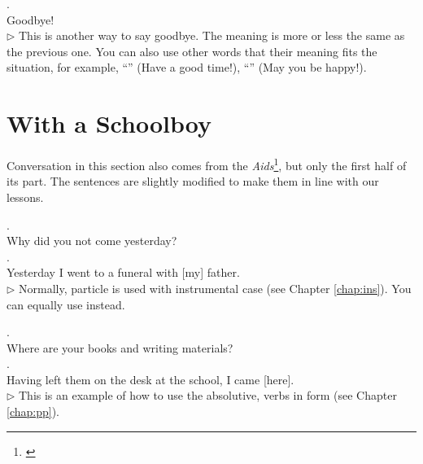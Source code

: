 \medskip
{}. \\
\hspace*{12mm}Goodbye!\\
{\small $\triangleright$ This is another way to say goodbye. The meaning is more or less the same as the previous one. You can also use other words that their meaning fits the situation, for example, ``'' (Have a good time!), ``'' (May you be happy!).}

{}
\section*{With a Schoolboy}

Conversation in this section also comes from the \emph{Aids}\footnote{\citealp[pp.~51--2]{buddhadatta:aids}}, but only the first half of its part. The sentences are slightly modified to make them in line with our lessons.

\medskip
{}. \\
\hspace*{12mm}Why did you not come yesterday?\\

\medskip
{}. \\
\hspace*{12mm}Yesterday I went to a funeral with [my] father.\\
{\small $\triangleright$ Normally, particle  is used with instrumental case (see Chapter \ref{chap:ins}). You can equally use  instead.}

\medskip
{}. \\
\hspace*{12mm}Where are your books and writing materials?\\

\medskip
{}. \\
\hspace*{12mm}Having left them on the desk at the school, I came [here].\\
{\small $\triangleright$ This is an example of how to use the absolutive, verbs in  form (see Chapter \ref{chap:pp}).}

